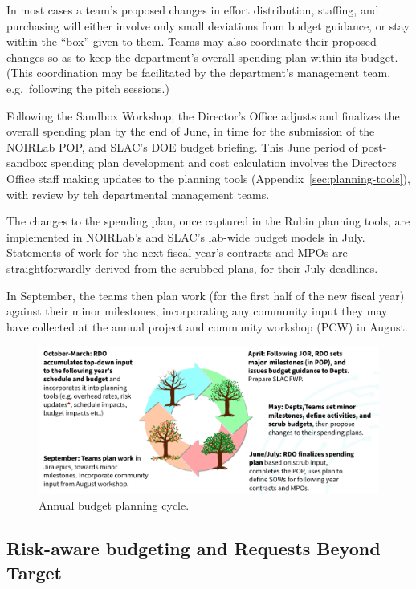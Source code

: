 In most cases a team's proposed changes in effort distribution, staffing, and purchasing will either involve only small deviations from budget guidance, or stay within the ``box'' given to them.
Teams may also coordinate their proposed changes so as to keep the department's overall spending plan within its budget.
(This coordination may be facilitated by the department's management team, e.g.\ following the pitch sessions.)

Following the Sandbox Workshop, the \gls{Director}'s Office adjusts and finalizes the overall spending plan by the end of June, in time for the submission of the NOIRLab \gls{POP}, and \gls{SLAC}'s DOE budget briefing.
This June period of post-sandbox spending plan development and cost calculation involves the Directors Office staff making updates to the planning tools (Appendix~\ref{sec:planning-tools}), with review by teh departmental management teams.

The changes to the spending plan, once captured in the Rubin planning tools, are implemented in \gls{NOIRLab}'s and \gls{SLAC}'s lab-wide budget models in July.
Statements of work for the next fiscal year's contracts and MPOs are straightforwardly derived from the scrubbed plans, for their July deadlines.

In September, the teams then plan work (for the first half of the new fiscal year) against their minor milestones, incorporating any community input they may have collected at the annual project and community workshop (\gls{PCW}) in August.

\begin{figure}[!ht]
\includegraphics[width=0.95\linewidth]{figures/annual-budget-cycle.png}
\caption{Annual budget planning \gls{cycle}.}
\label{fig:annual-cycle}
\end{figure}


\subsection{Risk-aware budgeting and Requests Beyond Target}

